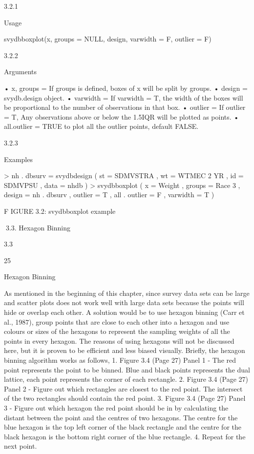 3.2.1

Usage

svydbboxplot(x, groups = NULL, design, varwidth = F, outlier = F)

3.2.2

Arguments

• x, groups = If groups is defined, boxes of x will be split by groups.
• design = svydb.design object.
• varwidth = If varwidth = T, the width of the boxes will be proportional to the
number of observations in that box.
• outlier = If outlier = T, Any observations above or below the 1.5IQR will be
plotted as points.
• all.outlier = TRUE to plot all the outlier points, default FALSE.

3.2.3

Examples

> nh . dbsurv = svydbdesign ( st = SDMVSTRA , wt = WTMEC 2 YR ,
id = SDMVPSU , data = nhdb )
> svydbboxplot ( x = Weight , groups = Race 3 ,
design = nh . dbsurv , outlier = T ,
all . outlier = F , varwidth = T )

F IGURE 3.2: svydbboxplot example

3.3. Hexagon Binning

3.3

25

Hexagon Binning

As mentioned in the beginning of this chapter, since survey data sets can be large
and scatter plots does not work well with large data sets because the points will
hide or overlap each other. A solution would be to use hexagon binning (Carr et al.,
1987), group points that are close to each other into a hexagon and use colours or
sizes of the hexagons to represent the sampling weights of all the points in every
hexagon. The reasons of using hexagons will not be discussed here, but it is proven
to be efficient and less biased visually.
Briefly, the hexagon binning algorithm works as follows,
1. Figure 3.4 (Page 27) Panel 1 - The red point represents the point to be binned.
Blue and black points represents the dual lattice, each point represents the corner of each rectangle.
2. Figure 3.4 (Page 27) Panel 2 - Figure out which rectangles are closest to the red
point. The intersect of the two rectangles should contain the red point.
3. Figure 3.4 (Page 27) Panel 3 - Figure out which hexagon the red point should be
in by calculating the distant between the point and the centres of two hexagons.
The centre for the blue hexagon is the top left corner of the black rectangle and
the centre for the black hexagon is the bottom right corner of the blue rectangle.
4. Repeat for the next point.

